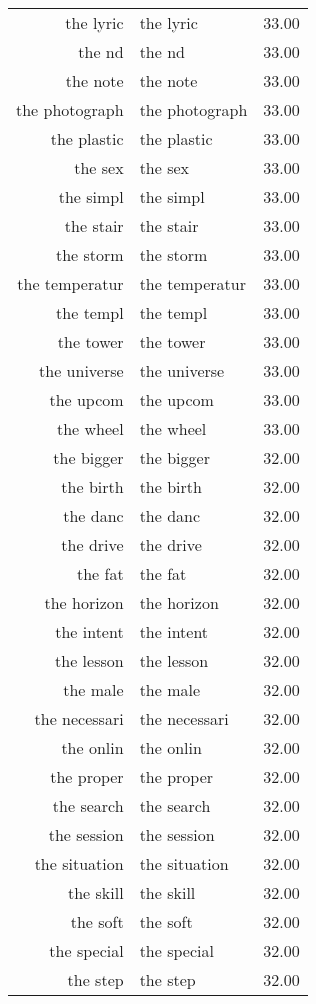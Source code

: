 \begin{table}[ht]
\begin{tabular}{rlr}
  the lyric & the lyric & 33.00 \\ 
  the nd & the nd & 33.00 \\ 
  the note & the note & 33.00 \\ 
  the photograph & the photograph & 33.00 \\ 
  the plastic & the plastic & 33.00 \\ 
  the sex & the sex & 33.00 \\ 
  the simpl & the simpl & 33.00 \\ 
  the stair & the stair & 33.00 \\ 
  the storm & the storm & 33.00 \\ 
  the temperatur & the temperatur & 33.00 \\ 
  the templ & the templ & 33.00 \\ 
  the tower & the tower & 33.00 \\ 
  the universe & the universe & 33.00 \\ 
  the upcom & the upcom & 33.00 \\ 
  the wheel & the wheel & 33.00 \\ 
  the bigger & the bigger & 32.00 \\ 
  the birth & the birth & 32.00 \\ 
  the danc & the danc & 32.00 \\ 
  the drive & the drive & 32.00 \\ 
  the fat & the fat & 32.00 \\ 
  the horizon & the horizon & 32.00 \\ 
  the intent & the intent & 32.00 \\ 
  the lesson & the lesson & 32.00 \\ 
  the male & the male & 32.00 \\ 
  the necessari & the necessari & 32.00 \\ 
  the onlin & the onlin & 32.00 \\ 
  the proper & the proper & 32.00 \\ 
  the search & the search & 32.00 \\ 
  the session & the session & 32.00 \\ 
  the situation & the situation & 32.00 \\ 
  the skill & the skill & 32.00 \\ 
  the soft & the soft & 32.00 \\ 
  the special & the special & 32.00 \\ 
  the step & the step & 32.00 \\ 

\end{tabular}
\end{table}
